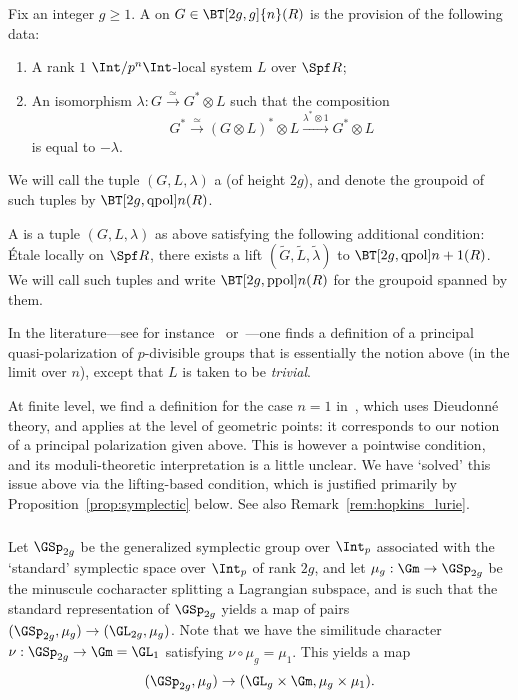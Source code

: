 \documentclass[10pt]{amsart}
\begin{document}
\begin{definition}
Fix an integer $g\ge 1$. A  on $G\in \BT[2g,g]{n}(R)$ is the provision of the following data: 
\begin{enumerate}
   \item A rank $1$ $\Int/p^n\Int$-local system $L$ over $\Spf R$;
   \item An isomorphism $\lambda:G\xrightarrow{\simeq}G^*\otimes L$ such that the composition
   \[
   G^*\xrightarrow{\simeq}(G\otimes L)^*\otimes L\xrightarrow{\lambda^*\otimes 1}G^*\otimes L
   \]
   is equal to $-\lambda$.
\end{enumerate}
We will call the tuple $(G,L,\lambda)$ a  (of height $2g$), and denote the groupoid of such tuples by $\BT[2g,\mathrm{qpol}]{n}(R)$.

A  is a tuple $(G,L,\lambda)$ as above satisfying the following additional condition: \'Etale locally on $\Spf R$, there exists a lift $(\tilde{G},\tilde{L},\tilde{\lambda})$ to $\BT[2g,\mathrm{qpol}]{n+1}(R)$. We will call such tuples  and write $\BT[2g,\mathrm{ppol}]{n}(R)$ for the groupoid spanned by them.
\end{definition} 

\begin{remark}
\label{rem:different_polarizations}
In the literature---see for instance~\cite{MR2141704} or~\cite{Cais_Ellenberg_Zureick-Brown_2013}---one finds a definition of a principal quasi-polarization of $p$-divisible groups that is essentially the notion above (in the limit over $n$), except that $L$ is taken to be \emph{trivial}.

At finite level, we find a definition for the case $n=1$ in~\cite[\S 2.6]{Moonen2001-xm}, which uses Dieudonn\'e theory, and applies at the level of geometric points: it corresponds to our notion of a principal polarization given above. This is however a pointwise condition, and its moduli-theoretic interpretation is a little unclear. We have `solved' this issue above via the lifting-based condition, which is justified primarily by Proposition~\ref{prop:symplectic} below. See also Remark~\ref{rem:hopkins_lurie}.
\end{remark}

\subsubsection{}
Let $\GSp_{2g}$ be the generalized symplectic group over $\Int_p$ associated with the `standard' symplectic space over $\Int_p$ of rank $2g$, and let $\mu_g:\Gm\to \GSp_{2g}$ be the minuscule cocharacter splitting a Lagrangian subspace, and is such that the standard representation of $\GSp_{2g}$ yields a map of pairs $(\GSp_{2g},\mu_g)\to (\GL_{2g},\mu_g)$. Note that we have the similitude character $\nu:\GSp_{2g}\to \Gm=\GL_1$ satisfying $\nu\circ \mu_g = \mu_1$. This yields a map
\[
(\GSp_{2g},\mu_g)\to (\GL_g\times \Gm,\mu_g\times \mu_1).
\]
\end{document}
